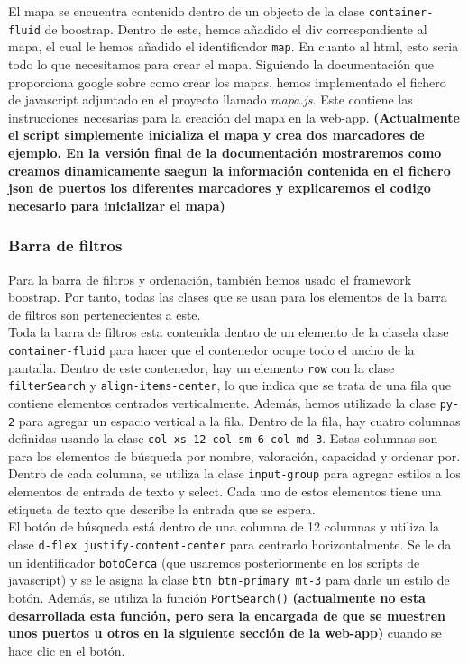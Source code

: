 \documentclass{article}
\begin{document}
\noindent El mapa se encuentra contenido dentro de un objecto de la clase \texttt{container-fluid} de boostrap. Dentro de este, hemos añadido el div correspondiente al mapa, el cual le hemos añadido el identificador \texttt{map}. En cuanto al html, esto seria todo lo que necesitamos para crear el mapa. Siguiendo la documentación que proporciona google sobre como crear los mapas, hemos implementado el fichero de javascript adjuntado en el proyecto llamado \textit{mapa.js}. Este contiene las instrucciones necesarias para la creación del mapa en la web-app. \textbf{(Actualmente el script simplemente inicializa el mapa y crea dos marcadores de ejemplo. En la versión final de la documentación mostraremos como creamos dinamicamente saegun la información contenida en el fichero json de puertos los diferentes marcadores y explicaremos el codigo necesario para inicializar el mapa)}

\subsubsection{Barra de filtros}
Para la barra de filtros y ordenación, también hemos usado el framework boostrap. Por tanto, todas las clases que se usan para los elementos de la barra de filtros son pertenecientes a este.\\

\noindent Toda la barra de filtros esta contenida dentro de un elemento de la clasela clase \texttt{container-fluid} para hacer que el contenedor ocupe todo el ancho de la pantalla. Dentro de este contenedor, hay un elemento \texttt{row} con la clase \texttt{filterSearch} y \texttt{align-items-center}, lo que indica que se trata de una fila que contiene elementos centrados verticalmente. Además, hemos utilizado la clase \texttt{py-2} para agregar un espacio vertical a la fila. Dentro de la fila, hay cuatro columnas definidas usando la clase \texttt{col-xs-12 col-sm-6 col-md-3}. Estas columnas son para los elementos de búsqueda por nombre, valoración, capacidad y ordenar por. Dentro de cada columna, se utiliza la clase \texttt{input-group} para agregar estilos a los elementos de entrada de texto y select. Cada uno de estos elementos tiene una etiqueta de texto que describe la entrada que se espera.\\

\noindent El botón de búsqueda está dentro de una columna de 12 columnas y utiliza la clase \texttt{d-flex justify-content-center} para centrarlo horizontalmente. Se le da un identificador \texttt{botoCerca} (que usaremos posteriormente en los scripts de javascript) y se le asigna la clase \texttt{btn btn-primary mt-3} para darle un estilo de botón. Además, se utiliza la función \texttt{PortSearch()} \textbf{(actualmente no esta desarrollada esta función, pero sera la encargada de que se muestren unos puertos u otros en la siguiente sección de la web-app)} cuando se hace clic en el botón.
\end{document}
